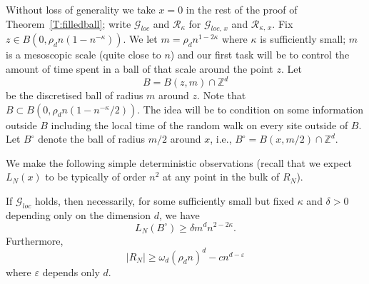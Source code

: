 \documentclass[AHL, Unicode, longabstracts, published]{cedram}
\newcommand*\Z {{\mathbb Z}}
\newcommand{\cG}{\mathcal{G}}
\newcommand{\cR}{\mathcal{R}}
\newcommand*\eps{\varepsilon}
\begin{document}
Without loss of generality we take $x = 0$ in the rest of the proof of Theorem~\ref{T:filledball}; write $\cG_{loc}$ and $\cR_\kappa$ for $\cG_{loc,\,x}$ and $\cR_{\kappa,\,x}$. Fix $z \in B(0, \rho_d n(1- n^{ - \kappa}))$. We let $m = \rho_d n^{1- 2\kappa}$ where $\kappa$ is sufficiently small; $m$ is a mesoscopic scale (quite close to $n$) and our first task will be to control the amount of time spent in a ball of that scale around the point $z$. Let
\[
B = B(z, m) \cap \Z^d
\]
be the discretised ball of radius $m$ around $z$. Note that $B \subset B(0, \rho_d n(1- n^{-\kappa}/2))$. The idea will be to condition on some information outside $B$ including the local time of the random walk on every site outside of $B$. Let $B^\circ$ denote the ball of radius $m/2$ around $x$, i.e., $B^\circ = B(x, m/2) \cap \Z^d$.

We make the following simple deterministic observations (recall that we expect $L_N(x)$ to be typically of order $n^2$ at any point in the bulk of $R_N$).

\begin{lemm}\label{L:det_time}
If $\cG_{loc}$ holds, then necessarily, for some sufficiently small but fixed $\kappa$ and $\delta>0$ depending only on the dimension $d$, we have
\begin{equation}\label{timeBcirc}
L_N(B^\circ) \ge \delta m^dn^{2- 2\kappa}.
\end{equation}
Furthermore,
\begin{equation}\label{range_det}
|R_N| \ge \omega_d(\rho_d n)^{d} - c n^{d-\eps}
\end{equation}
where $\eps$ depends only $d$.
\end{lemm}
\end{document}
